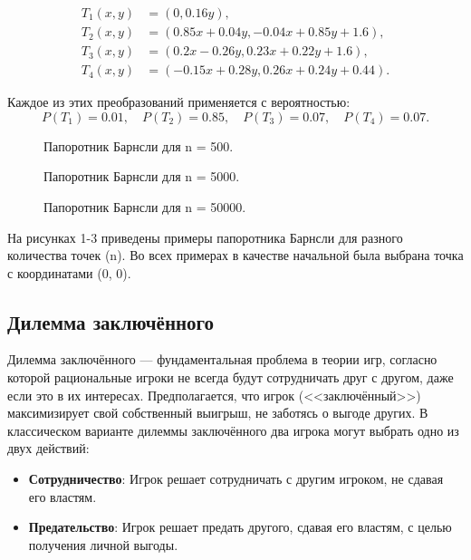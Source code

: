 \documentclass[a4paper, final]{article}
\begin{document}
	\[
	\begin{aligned}
		T_1(x, y) &= \left( 0, 0.16y \right), \\
		T_2(x, y) &= \left( 0.85x + 0.04y, -0.04x + 0.85y + 1.6 \right), \\
		T_3(x, y) &= \left( 0.2x - 0.26y, 0.23x + 0.22y + 1.6 \right), \\
		T_4(x, y) &= \left( -0.15x + 0.28y, 0.26x + 0.24y + 0.44 \right).
	\end{aligned}
	\]
	
	Каждое из этих преобразований применяется с вероятностью:
	\[
	P(T_1) = 0.01, \quad P(T_2) = 0.85, \quad P(T_3) = 0.07, \quad P(T_4) = 0.07.
	\]
	
	
	\begin{figure}[h!]
		\centering
		\caption{Папоротник Барнсли для n = 500.}
		\label{fig:fern500}
	\end{figure}
	
	\begin{figure}[h!]
		\centering
		\caption{Папоротник Барнсли для n = 5000.}
		\label{fig:fern5000}
	\end{figure}
	
	\begin{figure}[h!]
		\centering
		\caption{Папоротник Барнсли для n = 50000.}
		\label{fig:fern50000}
	\end{figure}
	
	На рисунках 1-3 приведены примеры папоротника Барнсли для разного количества точек (n). Во всех примерах в качестве начальной была выбрана точка с координатами (0, 0).
	
	\newpage
	\subsection{Дилемма заключённого}
	Дилемма заключённого — фундаментальная проблема в теории игр, согласно которой рациональные игроки не всегда будут сотрудничать друг с другом, даже если это в их интересах. Предполагается, что игрок (<<заключённый>>) максимизирует свой собственный выигрыш, не заботясь о выгоде других. В классическом варианте дилеммы заключённого два игрока могут выбрать одно из двух действий:
	
	\begin{itemize}
		\item \textbf{Сотрудничество}: Игрок решает сотрудничать с другим игроком, не сдавая его властям.
		\item \textbf{Предательство}: Игрок решает предать другого, сдавая его властям, с целью получения личной выгоды.
	\end{itemize}
	
\end{document}
